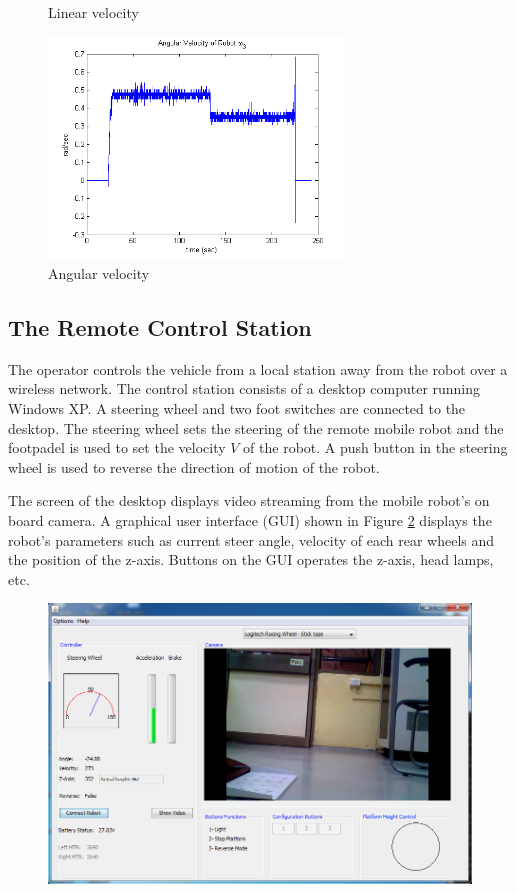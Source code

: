 \begin{figure}
\begin{minipage}[t]{0.5\textwidth}
	\caption{Linear velocity}\label{fig:cirVel}
\end{minipage}
\hfill
\begin{minipage}[t]{0.5\textwidth}
	\centering
	\includegraphics[width=3.1in]{Chapter5/fig/cirOmega} 
	\caption{Angular velocity}\label{fig:cirOmega}
\end{minipage}
\end{figure}

\subsection{The Remote Control Station}   
The operator controls the vehicle from a local station away from the robot over a wireless network. The control station consists of a desktop computer running Windows XP. A steering wheel and two foot switches are connected to the desktop. The steering wheel sets the steering of the remote mobile robot and the footpadel is used to set the velocity $V$ of the robot. A push button in the steering wheel is used to reverse the direction of motion of the robot.

The screen of the desktop displays  video streaming  from the mobile robot's on board camera. A graphical user  interface (GUI) shown in Figure \ref{fig:Gui} displays the robot's parameters such as current steer angle, velocity of each rear wheels and the position of the z-axis. Buttons on the GUI operates the z-axis, head lamps, etc.

\begin{figure}
	\includegraphics[width=\linewidth,keepaspectratio]{Chapter5/fig/gui}
	\label{fig:Gui} 
\end{figure}


